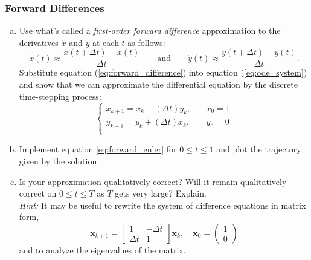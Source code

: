 \subsubsection*{Forward Differences}
\begin{enumerate}[(a)]
    \item Use what's called a \textit{first-order forward difference} approximation to the derivatives $\dot{x}$ and $\dot{y}$ at each $t$ as follows:
    \begin{equation} 
    \label{eq:forward_difference}
    \dot{x}(t) \approx \frac{x(t + \Delta t) - x(t)}{\Delta t} \qquad \text{and} \qquad \dot{y}(t) \approx \frac{y(t + \Delta t) - y(t)}{\Delta t}.
    \end{equation}
     Substitute equation (\ref{eq:forward_difference}) into equation (\ref{eq:ode_system}) and show that we can approximate the differential equation by the discrete time-stepping process:
    \begin{equation}
    \label{eq:forward_euler}
    \begin{cases} x_{k+1} = x_k - (\Delta t) y_k, & \quad x_0 = 1\\  y_{k+1} = y_k + (\Delta t) x_k, & \quad y_0 = 0\\  \end{cases}
    \end{equation}
    \item Implement equation \ref{eq:forward_euler} for $0 \leq t \leq 1$ and plot the trajectory given by the solution.
    \item Is your approximation qualitatively correct? Will it remain qualitatively correct on $0 \leq t \leq T$ as $T$ gets very large? Explain.\\
    \textit{Hint:} It may be useful to rewrite the system of difference equations in matrix form,
    \begin{equation*}
    \bm{x}_{k+1} 
    = \begin{bmatrix} 1 & -\Delta t \\  \Delta t & 1\end{bmatrix} \bm{x}_k, \quad \bm{x}_0 = \begin{pmatrix} 1\\0 \end{pmatrix}
    \end{equation*}
    and to analyze the eigenvalues of the matrix.
\end{enumerate}
